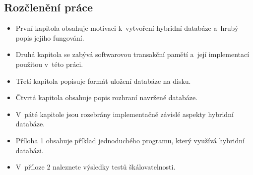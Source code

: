 \subsection*{Rozčlenění práce}
\begin{itemize}
  \item První kapitola obsahuje motivaci k~vytvoření hybridní databáze a~hrubý
    popis jejího fungování.
  \item Druhá kapitola se zabývá softwarovou transakční pamětí a~její implementací
    použitou v~této práci.
  \item Třetí kapitola popisuje formát uložení databáze na disku.
  \item Čtvrtá kapitola obsahuje popis rozhraní navržené databáze.
  \item V~páté kapitole jsou rozebrány implementačně závislé aspekty hybridní
    databáze.
  \item Příloha 1 obsahuje příklad jednoduchého programu, který využívá hybridní databázi.
  \item V~příloze 2 naleznete výsledky testů škálovatelnosti.
\end{itemize}

